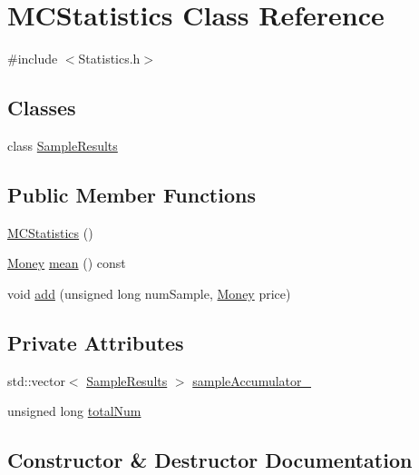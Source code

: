 \hypertarget{class_m_c_statistics}{}\section{M\+C\+Statistics Class Reference}
\label{class_m_c_statistics}


{\ttfamily \#include $<$Statistics.\+h$>$}

\subsection*{Classes}
\begin{DoxyCompactItemize}
\item 
class \hyperlink{class_m_c_statistics_1_1_sample_results}{Sample\+Results}
\end{DoxyCompactItemize}
\subsection*{Public Member Functions}
\begin{DoxyCompactItemize}
\item 
\hyperlink{class_m_c_statistics_aa4a6abdd39edf6efff8151da45568095}{M\+C\+Statistics} ()
\item 
\hyperlink{_name_def_8h_a5a9d48c16a694e9a2d9f1eca730dc8c5}{Money} \hyperlink{class_m_c_statistics_af1aab02cf590dee3fdc6d7b6cf9443fa}{mean} () const
\item 
void \hyperlink{class_m_c_statistics_a6557ced886141997d13d86777b1970c5}{add} (unsigned long num\+Sample, \hyperlink{_name_def_8h_a5a9d48c16a694e9a2d9f1eca730dc8c5}{Money} price)
\end{DoxyCompactItemize}
\subsection*{Private Attributes}
\begin{DoxyCompactItemize}
\item 
std\+::vector$<$ \hyperlink{class_m_c_statistics_1_1_sample_results}{Sample\+Results} $>$ \hyperlink{class_m_c_statistics_a60f5e1f87ba55ca837a3067ed726ff9a}{sample\+Accumulator\+\_\+}
\item 
unsigned long \hyperlink{class_m_c_statistics_ada9be8c85593b98c76b8b61252db97e2}{total\+Num}
\end{DoxyCompactItemize}


\subsection{Constructor \& Destructor Documentation}
\hypertarget{class_m_c_statistics_aa4a6abdd39edf6efff8151da45568095}{}\label{class_m_c_statistics_aa4a6abdd39edf6efff8151da45568095} 

